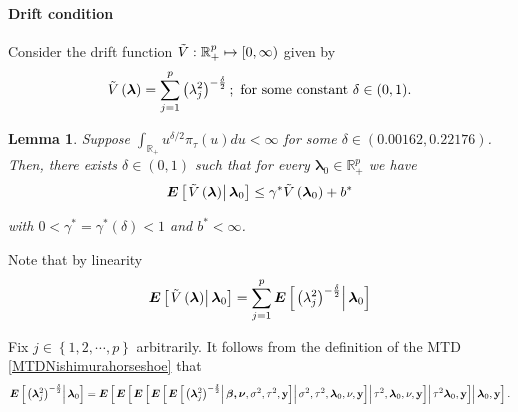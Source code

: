 \documentclass[noinfoline,11pt]{imsart}
\numberwithin{equation}{section}
\theoremstyle{plain}
\newtheorem{lem}{Lemma}[section]
\newcommand{\y}{\mathbf{y}}
\newcommand{\bl}{\boldsymbol{\lambda}}
\newcommand{\E}{\boldsymbol{E}}
\begin{document}
\paragraph{Drift condition}\label{driftNishimurahorseshoe}
Consider the drift function $\Tilde{V}:\mathbb{R}_+^p\mapsto[0,\infty)$ given by\\
\begin{equation}\label{driftfunctionNishimurahorseshoe}
    \Tilde{V}\left(\mathbf{\bl}\right)=\sum\limits_{j=1}^p\left(\lambda_j^2\right)^{-\frac{\delta}{2}};\ \text{for some constant}\ \delta\in(0,1). 
\end{equation}

\begin{lem}\label{Theorem1Nishimurahorseshoe}
Suppose $\int_{\mathbb{R}_+} u^{\delta/2} \pi_\tau (u) du < \infty$ for some $\delta \in (0.00162, 0.22176)$. Then, there exists $\delta\in(0,1)$ such that for every $\bl_0\in\mathbb{R}_+^p$ we have 
\begin{equation}\label{driftconditionreghorseshoe}
    \E\left[\left.\Tilde{V}\left(\mathbf{\bl}\right)\right|\mathbf{\bl}_0\right]\leq \gamma^* \Tilde{V}\left(\mathbf{\bl}_0\right)+b^*
\end{equation}

with $0<\gamma^*=\gamma^*\left(\delta\right)<1$ and $b^*<\infty$. \\
\end{lem}

\proof 
\iffalse 
Note that by linearity 
\begin{equation} \label{Nishimuraexpectations:linearity}
\E\left[\left.\Tilde{V}\left(\mathbf{\bl}\right)\right|\mathbf{\bl}_0\right] =  \sum_{j=1}^p \E\left[\left. \left(\lambda_j^2\right)^{-\frac{\delta}{2}} \right|\mathbf{\bl}_0\right]
\end{equation}

\noindent
Fix $j\in\left\{1,2,\cdots,p\right\}$ arbitrarily. It follows from the definition of the MTD \eqref{MTDNishimurahorseshoe} that 
\begin{equation} \label{Nishimuraexpectations:iterated}
\E\left[\left.\left(\bl_j^2\right)^{-\frac{\delta}{2}}\right|\mathbf{\bl}_0\right]=\E\left[\left.\E\left[\left.\E\left[\left.\E\left[\left.\E\left[\left.\left(\bl_j^2\right)^{-\frac{\delta}{2}}\right|\boldsymbol{\beta,\nu},\sigma^2,\tau^2,\mathbf{\y}\right]\right|\sigma^2,\tau^2,\mathbf{\bl}_0,\mathbf{\nu,\y}\right]\right|\tau^2,\bl_0,\mathbf{\nu},\y\right]\right|\tau^2\mathbf{\bl}_0,\mathbf{\y}\right]\right|\bl_0,\y\right]. \\ 
\end{equation}
\end{document}
